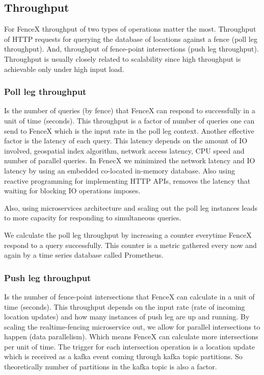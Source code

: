 \documentclass[a4]{report}
\begin{document}
    \subsection{Throughput}
    For FenceX throughput of two types of operations matter the most.
    Throughput of HTTP requests for querying the database of locations against a fence (poll leg throughput).
    And, throughput of fence-point intersections (push leg throughput).
    Throughput is usually closely related to scalability since high throughput is achievable only under high input load.

    \subsubsection{Poll leg throughput}
    Is the number of queries (by fence) that FenceX can respond to successfully in a unit of time (seconds).
    This throughput is a factor of number of queries one can send to FenceX which is the input rate in the poll leg context.
    Another effective factor is the latency of each query.
    This latency depends on the amount of IO involved, geospatial index algorithm, network access latency, CPU speed
    and number of parallel queries.
    In FenecX we minimized the network latency and IO latency by using an embedded co-located in-memory database.
    Also using reactive programming for implementing HTTP APIs, removes the latency that waiting for blocking IO
    operations imposes.

    Also, using microservices architecture and scaling out the poll leg instances leads to more capacity for responding
    to simultaneous queries.

    We calculate the poll leg throughput by increasing a counter everytime FenceX respond to a query successfully.
    This counter is a metric gathered every now and again by a time series database called Prometheus.

    \subsubsection{Push leg throughput}
    Is the number of fence-point intersections that FenceX can calculate in a unit of time (seconds).
    This throughput depends on the input rate (rate of incoming location updates) and how many instances of push leg
    are up and running.
    By scaling the realtime-fencing microservice out, we allow for parallel intersections to happen (data parallelism).
    Which means FenceX can calculate more intersections per unit of time.
    The trigger for each intersection operation is a location update which is received as a kafka event coming through
    kafka topic partitions.
    So theoretically number of partitions in the kafka topic is also a factor.
\end{document}
